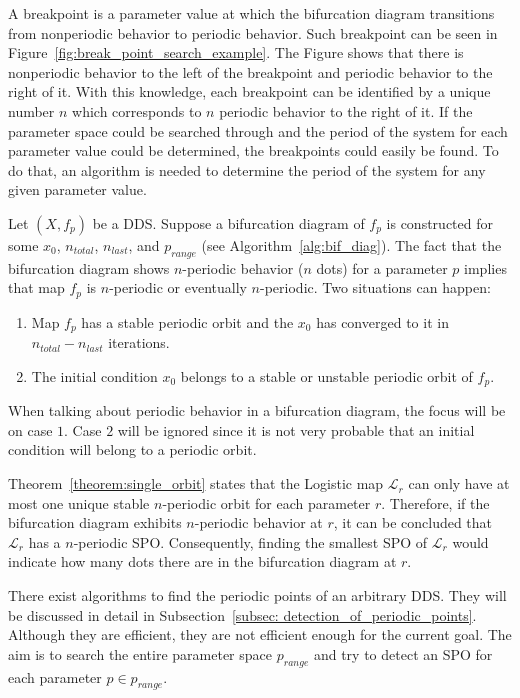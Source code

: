 A breakpoint is a parameter value at which the bifurcation diagram transitions from nonperiodic behavior to periodic behavior.
Such breakpoint can be seen in Figure~\ref{fig:break_point_search_example}.
The Figure shows that there is nonperiodic behavior to the left of the breakpoint and periodic behavior to the right of it.
With this knowledge, each breakpoint can be identified by a unique number $n$ which corresponds to $n$ periodic behavior to the right of it.
If the parameter space could be searched through and the period of the system for each parameter value could be determined, the breakpoints could easily be found.
To do that, an algorithm is needed to determine the period of the system for any given parameter value.
\par
Let $(X, f_{p})$ be a DDS. Suppose a bifurcation diagram of $f_{p}$ is constructed for some $x_0$, $n_{total}$, $n_{last}$, and $p_{range}$ (see Algorithm~\ref{alg:bif_diag}).
The fact that the bifurcation diagram shows $n$-periodic behavior ($n$ dots) for a parameter $p$ implies that map $f_{p}$ is $n$-periodic or eventually $n$-periodic.
Two situations can happen:
\begin{enumerate}
    \item Map $f_{p}$ has a stable periodic orbit and the $x_0$ has converged to it in $n_{total}-n_{last}$ iterations.
    \item The initial condition $x_0$ belongs to a stable or unstable periodic orbit of $f_p$.
\end{enumerate}
When talking about periodic behavior in a bifurcation diagram, the focus will be on case $1$.
Case $2$ will be ignored since it is not very probable that an initial condition will belong to a periodic orbit.
\par
Theorem~\ref{theorem:single_orbit} states that the Logistic map $\mathcal{L}_r$ can only have at most one unique stable $n$-periodic orbit for each parameter $r$.
Therefore, if the bifurcation diagram exhibits $n$-periodic behavior at $r$, it can be concluded that $\mathcal{L}_{r}$ has a $n$-periodic SPO.
Consequently, finding the smallest SPO of $\mathcal{L}_{r}$ would indicate how many dots there are in the bifurcation diagram at $r$.
\par
There exist algorithms to find the periodic points of an arbitrary DDS.
They will be discussed in detail in Subsection~\ref{subsec: detection_of_periodic_points}.
Although they are efficient, they are not efficient enough for the current goal.
The aim is to search the entire parameter space $p_{range}$ and try to detect an SPO for each parameter $p \in p_{range}$.
